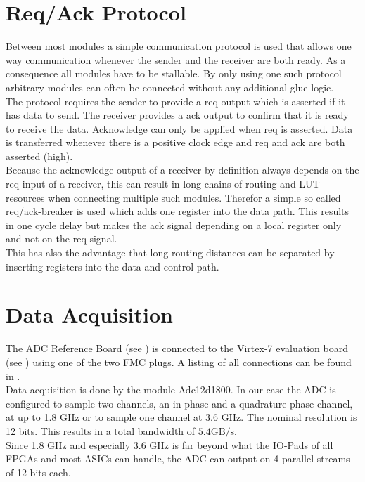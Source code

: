 \section{Req/Ack Protocol}
\label{sec:fpga_reqack}
Between most modules a simple communication protocol is used that allows
one way communication whenever the sender and the receiver are both
ready. As a consequence all modules have to be stallable. By only using
one such protocol arbitrary modules can often be connected
without any additional glue logic. \\

The protocol requires the sender to provide a \acrfull{req} output which
is asserted if it has data to send. The receiver provides a \acrfull{ack}
output to confirm that it is ready to receive the data.
Acknowledge can only be applied when \gls{req} is asserted.
Data is transferred whenever there is a positive clock edge and
\gls{req} and \gls{ack} are both asserted (high). \\

Because the acknowledge output of a receiver by definition always depends on the
\gls{req} input of a receiver, this can result in long chains of routing and
\gls{LUT} resources when connecting multiple such modules.
Therefor a simple so called \gls{req}/\gls{ack}-breaker is used which adds one
register into the data path. This results in one cycle delay but makes the
\gls{ack} signal depending on a local register only and not on the
\gls{req} signal. \\

This has also the advantage that long routing distances can be separated by
inserting registers into the data and control path. \\

\section{Data Acquisition}
\label{sec:fpga_adc}

The \gls{ADC} Reference Board (see ) is connected
to the Virtex-7 evaluation board (see )
using one of the two \gls{FMC} plugs.
A listing of all connections can be found in . \\

Data acquisition is done by the module Adc12d1800. In our case the ADC is
configured to sample two channels, an in-phase and a quadrature phase channel,
at up to 1.8 GHz or to sample one channel at 3.6 GHz.
The nominal resolution is 12 bits. This results in a total bandwidth of
$5.4 \text{GB}/\text{s}$. \\
Since 1.8 GHz and especially 3.6 GHz is far beyond what the IO-Pads of all
\glspl{FPGA}  and most \glspl{ASIC} can handle,
the ADC can output on 4 parallel streams of 12 bits each. \\

